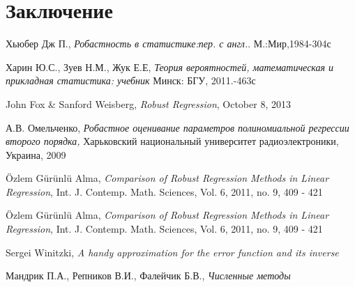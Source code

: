 \documentclass[12pt]{article}
\begin{document}
\section{Заключение}
\begin{thebibliography}{9}
    Хьюбер Дж П.,
    \textit{Робастность в статистике:пер. с англ.}.
    М.:Мир,1984-304с

    Харин Ю.С., Зуев Н.М.,
    Жук Е.Е,
    \textit{Теория вероятностей, математическая и прикладная статистика: учебник}
    Минск: БГУ, 2011.-463с

    John Fox \& Sanford Weisberg,
    \textit{Robust Regression},
    October 8, 2013

    А.В. Омельченко,
    \textit{Робастное оценивание параметров полиномиальной регрессии второго порядка,}
    Харьковский национальный университет радиоэлектроники, Украина, 2009

    \"{O}zlem G\"{u}r\"{u}nl\"{u} Alma,
    \textit{Comparison of Robust Regression Methods
    in Linear Regression},
    Int. J. Contemp. Math. Sciences, Vol. 6, 2011, no. 9, 409 - 421

    \"{O}zlem G\"{u}r\"{u}nl\"{u} Alma,
    \textit{Comparison of Robust Regression Methods
    in Linear Regression},
    Int. J. Contemp. Math. Sciences, Vol. 6, 2011, no. 9, 409 - 421

    Sergei Winitzki,
    \textit{A handy approximation for the error function and its inverse}

    Мандрик П.А., Репников В.И., Фалейчик Б.В.,
    \textit{Численные методы}
\end{thebibliography}
\end{document}
